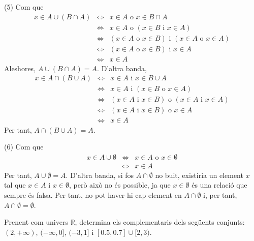 \begin{solucio}
(5) Com que
\begin{equation*}
\begin{array}{lll}
x\in A\cup (B\cap A) & \Longleftrightarrow & x\in A\text{ o }x\in B\cap A \\
& \Longleftrightarrow & x\in A\text{ o }\left( x\in B\text{ i }x\in A\right)
\\
& \Longleftrightarrow & \left( x\in A\text{ o }x\in B\right) \text{ i }%
\left( x\in A\text{ o }x\in A\right) \\
& \Longleftrightarrow & \left( x\in A\text{ o }x\in B\right) \text{ i }x\in A
\\
& \Longleftrightarrow & x\in A%
\end{array}%
\end{equation*}%
Aleshores, $A\cup (B\cap A)=A$. D'altra banda,%
\begin{equation*}
\begin{array}{lll}
x\in A\cap (B\cup A) & \Longleftrightarrow & x\in A\text{ i }x\in B\cup A \\
& \Longleftrightarrow & x\in A\text{ i }\left( x\in B\text{ o }x\in A\right)
\\
& \Longleftrightarrow & \left( x\in A\text{ i }x\in B\right) \text{ o }%
\left( x\in A\text{ i }x\in A\right) \\
& \Longleftrightarrow & \left( x\in A\text{ i }x\in B\right) \text{ o }x\in A
\\
& \Longleftrightarrow & x\in A%
\end{array}%
\end{equation*}%
Per tant, $A\cap (B\cup A)=A$.

(6) Com que%
\begin{equation*}
\begin{array}{lll}
x\in A\cup \emptyset & \Longleftrightarrow & x\in A\text{ o }x\in \emptyset
\\
& \Longleftrightarrow & x\in A%
\end{array}%
\end{equation*}%
Per tant, $A\cup \emptyset =A$. D'altra banda, si fos $A\cap \emptyset $ no
buit, existiria un element $x$ tal que $x\in A$ i $x\in \emptyset $, però
això no és possible, ja que $x\in \emptyset $ és una relació
que sempre és falsa. Per tant, no pot haver-hi cap element en $A\cap
\emptyset $ i, per tant, $A\cap \emptyset =\emptyset $.
\end{solucio}

\begin{exercici}
Prenent com univers $\mathbb{R}$, determina els complementaris dels següents conjunts: $(2,+\infty )$, $(-\infty ,0]$, $(-3,1]$ i $[0.5,0.7]\cup
[ 2,3)$.
\end{exercici}

